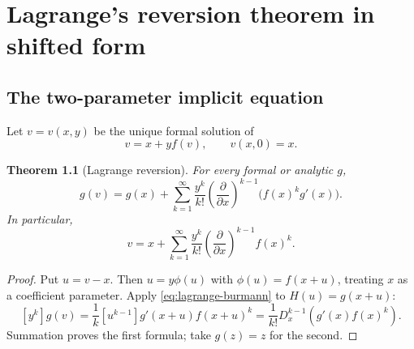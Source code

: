\documentclass[11pt,a4paper,oneside,openany]{book}
\newtheorem{theorem}{Theorem}[chapter]
\theoremstyle{definition}
\theoremstyle{remark}
\begin{document}
\chapter{Lagrange's reversion theorem in shifted form}

\section{The two-parameter implicit equation}
Let $v=v(x,y)$ be the unique formal solution of
\begin{equation}\label{eq:shifted-reversion-equation}
 v=x+yf(v),
 \qquad v(x,0)=x.
\end{equation}

\begin{theorem}[Lagrange reversion]\label{thm:shifted-lagrange-reversion}
For every formal or analytic $g$,
\begin{equation}\label{eq:shifted-lagrange-reversion}
 g(v)=g(x)+\sum_{k=1}^{\infty}\frac{y^k}{k!}
 \left(\frac{\partial}{\partial x}\right)^{k-1}
 \bigl(f(x)^kg'(x)\bigr).
\end{equation}
In particular,
\begin{equation}\label{eq:shifted-lagrange-v}
 v=x+\sum_{k=1}^{\infty}\frac{y^k}{k!}
 \left(\frac{\partial}{\partial x}\right)^{k-1}f(x)^k.
\end{equation}
\end{theorem}
\begin{proof}
Put $u=v-x$.  Then $u=y\phi(u)$ with $\phi(u)=f(x+u)$, treating $x$ as a
coefficient parameter.  Apply \eqref{eq:lagrange-burmann} to
$H(u)=g(x+u)$:
\[
 [y^k]g(v)=\frac1k[u^{k-1}]g'(x+u)f(x+u)^k
 =\frac1{k!}D_x^{k-1}(g'(x)f(x)^k).
\]
Summation proves the first formula; take $g(z)=z$ for the second.
\end{proof}
\end{document}
